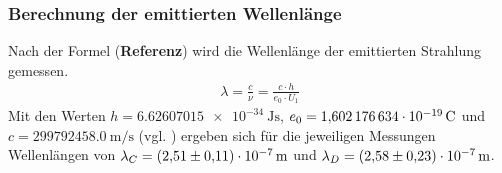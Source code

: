 \subsubsection{Berechnung der emittierten Wellenlänge}
Nach der Formel (\textbf{Referenz}) wird die Wellenlänge der emittierten Strahlung gemessen.
\begin{align}
    \lambda = \frac{c}{\nu} = \frac{c \cdot h}{e_0 \cdot U_1}
\end{align}
Mit den Werten $h=\qty{6.62607015e-34}{\joule\s}$, $e_0 = \qty{1.602176634e-19}{\C}$ 
und $c = \qty{299792458.0}{\meter\per\second}$ (vgl. \cite{scipy})
ergeben sich für die jeweiligen Messungen Wellenlängen von $\lambda_C = \qty{ 2.51 +- 0.11 e-07}{\m}$ und $\lambda_D= \qty{2.58 +- 0.23 e-07}{\m}$.